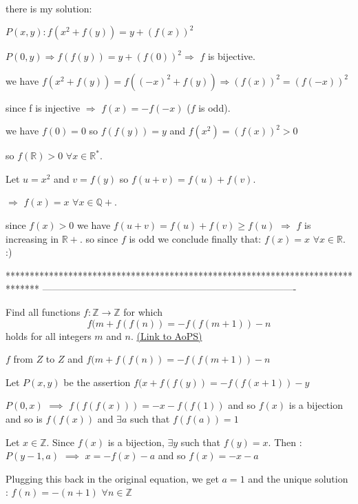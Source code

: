 \begin{solution}
	there is my solution:


$ P(x,y): f(x^{2} + f(y)) = y + (f(x))^{2}$

$ P(0,y)\Rightarrow f(f(y)) = y + (f(0))^{2}\Rightarrow$ $ f$ is bijective.

we have $ f(x^{2} + f(y)) = f(( - x)^{2} + f(y)) \Rightarrow (f(x))^{2} = (f( - x))^{2}$
 
since f is injective $ \Rightarrow$ $ f(x) = - f( - x)$ ($ f$ is odd).

we have $ f(0) = 0$ so $ f(f(y)) = y$ and $ f(x^{2}) = (f(x))^{2} > 0$

so $ f(\mathbb{R}) > 0$ $ \forall x\in\mathbb{R^{*}}$.

Let $ u = x^{2}$ and $ v = f(y)$ so $ f(u + v) = f(u) + f(v)$.

$ \Rightarrow$ $ f(x) = x$ $ \forall x\in{\mathbb{Q + }}$.

since $ f(x) > 0$ we have $ f(u + v) = f(u) + f(v)\ge f(u)$ $ \Rightarrow$ $ f$ is increasing in $ \mathbb{R + }$. so since $ f$ is odd we conclude finally that: $ f(x) = x$ $ \forall x\in\mathbb{R}$. :)
\end{solution}
*******************************************************************************
-------------------------------------------------------------------------------

\begin{problem}
	Find all functions $f: \mathbb Z \to \mathbb Z$ for which
\[ f(m+f(f(n))=-f(f(m+1))-n\]
holds for all integers $m$ and $n$.
	\flushright \href{https://artofproblemsolving.com/community/c6h316534}{(Link to AoPS)}
\end{problem}



\begin{solution}
	\begin{tcolorbox}$ f$ from $ Z$ to $ Z$ and $ f(m + f(f(n)) = - f(f(m + 1)) - n$\end{tcolorbox}

Let $ P(x,y)$ be the assertion $ f(x+f(f(y))=-f(f(x+1))-y$

$ P(0,x)$ $ \implies$ $ f(f(f(x)))=-x-f(f(1))$ and so $ f(x)$ is a bijection and so is $ f(f(x))$ and $ \exists a$ such that $ f(f(a))=1$

Let $ x\in\mathbb Z$. Since $ f(x)$ is a bijection, $ \exists y$ such that $ f(y)=x$. Then : $ P(y-1,a)$ $ \implies$ $ x=-f(x)-a$ and so $ f(x)=-x-a$

Plugging this back in the original equation, we get $ a=1$ and the unique solution : $ \boxed{f(n)=-(n+1)}$ $ \forall n\in\mathbb Z$
\end{solution}



